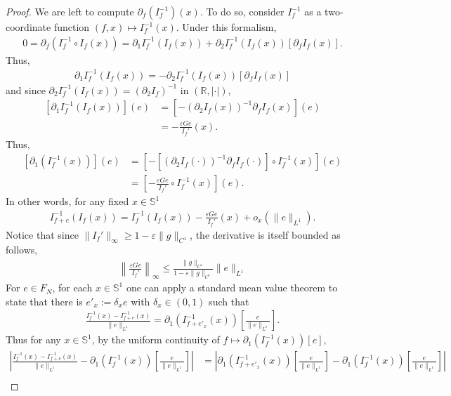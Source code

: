 \documentclass[12pt]{article}
\newcommand{\eps}{\varepsilon}
\theoremstyle{plain}
\begin{document}
{\begin{proof}
We are left to compute $\partial_f (I_f^{-1})(x)$. To do so, consider $I_f^{-1}$ as a two-coordinate function $(f,x)\mapsto I_f^{-1}(x)$. Under this formalism,
\begin{align*}
    0=\partial_f(I_f^{-1}\circ I_f(x))=\partial_1I_f^{-1}(I_f(x))+\partial_2I_f^{-1}(I_f(x))[\partial_fI_f(x)].
\end{align*}
Thus,
\begin{align*}
\partial_1I_f^{-1}(I_f(x))=-\partial_2I_f^{-1}(I_f(x))[\partial_fI_f(x)]   
\end{align*}
and since $\partial_2I_f^{-1}(I_f(x))=(\partial_2I_f)^{-1}$ in $(\mathbb R,|\cdot|)$,
\begin{align*}
\left[\partial_1I_f^{-1}(I_f(x))\right](e)&=\left[-(\partial_2I_f(x))^{-1}\partial_fI_f(x)\right](e)\\
&=-\frac{\eps G e}{I_f'}(x).
\end{align*}
Thus, 
\begin{align*}
    \left[\partial_1(I_f^{-1}(x))\right](e)&=\left[-\left[(\partial_2I_f(\cdot))^{-1}\partial_fI_f(\cdot)\right]\circ I_f^{-1}(x)\right](e)\\
&=\left[-\frac{\eps G e}{I_f'}\circ  I_f^{-1}(x)\right](e).
\end{align*}
In other words, for any fixed $x\in \mathbb S^1$
\begin{align}\label{eq:derivifsansexp}
I_{f+e}^{-1}(I_f(x))=I_f^{-1}(I_f(x))-\frac{\eps G e}{I_f'}(x)+o_x(\|e\|_{L^1}).
\end{align}
Notice that since $\|I_f'\|_\infty\geq 1-\eps\|g\|_{C^1}$, the derivative is itself bounded as follows,
\begin{align}\label{eq:deltaboundf}
    \left\|\frac{\eps G e}{I_f'}\right\|_{\infty}\leq \frac{\|g\|_{C^1}}{1-\eps\|g\|_{C^1}}\|e\|_{L^1}
\end{align}
For $e\in F_N$,
for each $x\in \mathbb S^1$ one can apply a standard mean value theorem to state that there is $e'_x:=\delta_x e$ with $\delta_x\in (0,1)$ such that
\begin{align*}
    \frac{I_f^{-1}(x)-I_{f+e}^{-1}(x)}{\|e\|_{L^1}}=\partial_1(I_{f+e'_x}^{-1}(x))[\frac{e}{\|e\|_{L^1}}].
\end{align*}
Thus for any $x\in \mathbb S^1$, by the uniform continuity of $f\mapsto \partial_1(I_f^{-1}(x))[e]$,
\begin{align}
    \left|\frac{I_f^{-1}(x)-I_{f+e}^{-1}(x)}{\|e\|_{L^1}}-\partial_1(I_f^{-1}(x))\left[\frac{e}{\|e\|_{L^1}}\right]\right|&=\left|\partial_1(I_{f+e'_x}^{-1}(x))\left[\frac{e}{\|e\|_{L^1}}\right]-\partial_1(I_f^{-1}(x))\left[\frac{e}{\|e\|_{L^1}}\right]\right|\nonumber\\

\end{align}
\end{proof}}
\end{document}
